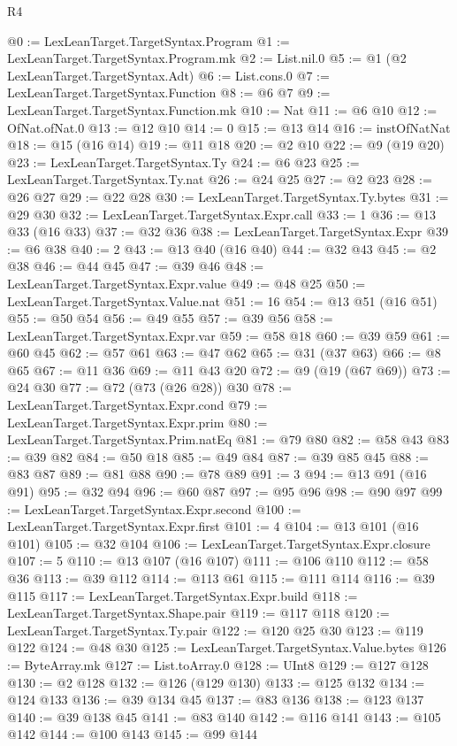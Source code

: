 \begin{lexlean}{R4}
\begin{coremodule}
{{{{{{{{{{{{{{{@0 := LexLeanTarget.TargetSyntax.Program
@1 := LexLeanTarget.TargetSyntax.Program.mk
@2 := List.nil.{0}
@5 := @1 (@2 LexLeanTarget.TargetSyntax.Adt)
@6 := List.cons.{0}
@7 := LexLeanTarget.TargetSyntax.Function
@8 := @6 @7
@9 := LexLeanTarget.TargetSyntax.Function.mk
@10 := Nat
@11 := @6 @10
@12 := OfNat.ofNat.{0}
@13 := @12 @10
@14 := 0
@15 := @13 @14
@16 := instOfNatNat
@18 := @15 (@16 @14)
@19 := @11 @18
@20 := @2 @10
@22 := @9 (@19 @20)
@23 := LexLeanTarget.TargetSyntax.Ty
@24 := @6 @23
@25 := LexLeanTarget.TargetSyntax.Ty.nat
@26 := @24 @25
@27 := @2 @23
@28 := @26 @27
@29 := @22 @28
@30 := LexLeanTarget.TargetSyntax.Ty.bytes
@31 := @29 @30
@32 := LexLeanTarget.TargetSyntax.Expr.call
@33 := 1
@36 := @13 @33 (@16 @33)
@37 := @32 @36
@38 := LexLeanTarget.TargetSyntax.Expr
@39 := @6 @38
@40 := 2
@43 := @13 @40 (@16 @40)
@44 := @32 @43
@45 := @2 @38
@46 := @44 @45
@47 := @39 @46
@48 := LexLeanTarget.TargetSyntax.Expr.value
@49 := @48 @25
@50 := LexLeanTarget.TargetSyntax.Value.nat
@51 := 16
@54 := @13 @51 (@16 @51)
@55 := @50 @54
@56 := @49 @55
@57 := @39 @56
@58 := LexLeanTarget.TargetSyntax.Expr.var
@59 := @58 @18
@60 := @39 @59
@61 := @60 @45
@62 := @57 @61
@63 := @47 @62
@65 := @31 (@37 @63)
@66 := @8 @65
@67 := @11 @36
@69 := @11 @43 @20
@72 := @9 (@19 (@67 @69))
@73 := @24 @30
@77 := @72 (@73 (@26 @28)) @30
@78 := LexLeanTarget.TargetSyntax.Expr.cond
@79 := LexLeanTarget.TargetSyntax.Expr.prim
@80 := LexLeanTarget.TargetSyntax.Prim.natEq
@81 := @79 @80
@82 := @58 @43
@83 := @39 @82
@84 := @50 @18
@85 := @49 @84
@87 := @39 @85 @45
@88 := @83 @87
@89 := @81 @88
@90 := @78 @89
@91 := 3
@94 := @13 @91 (@16 @91)
@95 := @32 @94
@96 := @60 @87
@97 := @95 @96
@98 := @90 @97
@99 := LexLeanTarget.TargetSyntax.Expr.second
@100 := LexLeanTarget.TargetSyntax.Expr.first
@101 := 4
@104 := @13 @101 (@16 @101)
@105 := @32 @104
@106 := LexLeanTarget.TargetSyntax.Expr.closure
@107 := 5
@110 := @13 @107 (@16 @107)
@111 := @106 @110
@112 := @58 @36
@113 := @39 @112
@114 := @113 @61
@115 := @111 @114
@116 := @39 @115
@117 := LexLeanTarget.TargetSyntax.Expr.build
@118 := LexLeanTarget.TargetSyntax.Shape.pair
@119 := @117 @118
@120 := LexLeanTarget.TargetSyntax.Ty.pair
@122 := @120 @25 @30
@123 := @119 @122
@124 := @48 @30
@125 := LexLeanTarget.TargetSyntax.Value.bytes
@126 := ByteArray.mk
@127 := List.toArray.{0}
@128 := UInt8
@129 := @127 @128
@130 := @2 @128
@132 := @126 (@129 @130)
@133 := @125 @132
@134 := @124 @133
@136 := @39 @134 @45
@137 := @83 @136
@138 := @123 @137
@140 := @39 @138 @45
@141 := @83 @140
@142 := @116 @141
@143 := @105 @142
@144 := @100 @143
@145 := @99 @144
}}}}}}}}}}}}}}}
\end{coremodule}
\end{lexlean}
